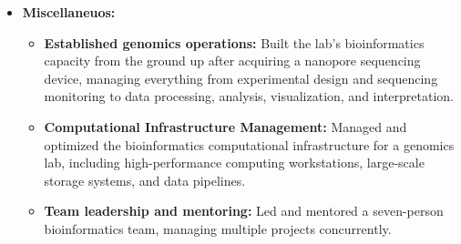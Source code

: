 \documentclass[11pt,a4paper,sans]{moderncv}
\begin{document}
{\begin{itemize}
    \item \textbf{Miscellaneuos:}
    \begin{itemize}
      \item \textbf{Established genomics operations:} Built the lab's bioinformatics capacity from the ground up after acquiring a nanopore sequencing device, managing everything from experimental design and sequencing monitoring to data processing, analysis, visualization, and interpretation.
      \item \textbf{Computational Infrastructure Management:} Managed and optimized the bioinformatics computational infrastructure for a genomics lab, including high-performance computing workstations, large-scale storage systems, and data pipelines.
      \item \textbf{Team leadership and mentoring:} Led and mentored a seven-person bioinformatics team, managing multiple projects concurrently.
      \end{itemize}
  \end{itemize}
  }

\end{document}
